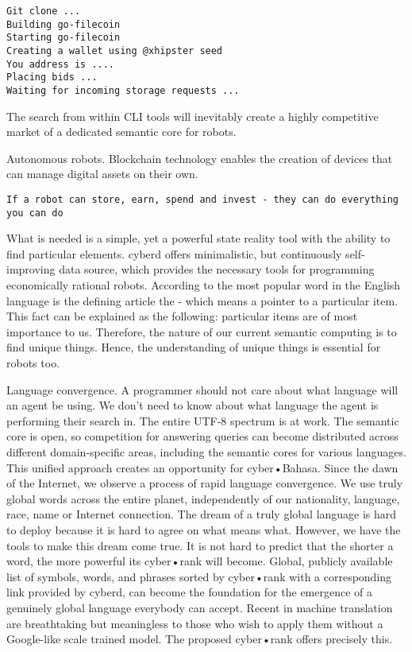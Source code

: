 \documentclass[8pt,oneside]{amsart}
\newcommand{\linkgreen}[2]{\href{#1}{\color{green}{#2}}}
\newcommand{\code}[1]{{\PlayBold #1}}
\begin{document}
\begin{Abstract}
\begin{lstlisting}
Git clone ...
Building go-filecoin
Starting go-filecoin
Creating a wallet using @xhipster seed
You address is ....
Placing bids ...
Waiting for incoming storage requests ...

\end{lstlisting}

The search from within CLI tools will inevitably create a highly competitive market of a dedicated semantic core for robots.

\code{Autonomous robots}. Blockchain technology enables the creation of devices that can manage digital assets on their own.

\begin{lstlisting}
If a robot can store, earn, spend and invest - they can do everything you can do
\end{lstlisting}

What is needed is a simple, yet a powerful state reality tool with the ability to find particular elements. \code{cyberd} offers minimalistic, but continuously self-improving data source, which provides the necessary tools for programming economically rational robots. According to \linkgreen{https://github.com/first20hours/google-10000-english}{top-10000 English words} the most popular word in the English language is the defining article \code{the} - which means a pointer to a particular item. This fact can be explained as the following: particular items are of most importance to us. Therefore, the nature of our current semantic computing is to find unique things. Hence, the understanding of unique things is essential for robots too.

\code{Language convergence}. A programmer should not care about what language will an agent be using. We don't need to know about what language the agent is performing their search in. The entire UTF-8 spectrum is at work. The semantic core is open, so competition for answering queries can become distributed across different domain-specific areas, including the semantic cores for various languages. This unified approach creates an opportunity for cyber•Bahasa. Since the dawn of the Internet, we observe a process of rapid language convergence. We use truly global words across the entire planet, independently of our nationality, language, race, name or Internet connection. The dream of a truly global language is hard to deploy because it is hard to agree on what means what. However, we have the tools to make this dream come true. It is not hard to predict that the shorter a word, the more powerful its cyber•rank will become. Global, publicly available list of symbols, words, and phrases sorted by cyber•rank with a corresponding link provided by cyberd, can become the foundation for the emergence of a genuinely global language everybody can accept. Recent \linkgreen{https://ipfs.io/ipfs/QmQUWBhDMfPKgFt3NfbxM1VU22oU8CRepUzGPBDtopwap1}{scientific advances} in machine translation are breathtaking but meaningless to those who wish to apply them without a Google-like scale trained model. The proposed cyber•rank offers precisely this.


\end{Abstract}
\end{document}
